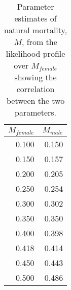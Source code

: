 \begin{table}[H]

\caption{\label{tab:profile-M}Parameter estimates of natural mortality, $M$, from the likelihood profile over $M_{female}$ showing the correlation between the two parameters.}
\centering
\begin{tabular}[t]{rr}
\toprule
$M_{female}$ & $M_{male}$\\
\midrule
0.100 & 0.150\\
0.150 & 0.157\\
0.200 & 0.205\\
0.250 & 0.254\\
0.300 & 0.302\\
0.350 & 0.350\\
0.400 & 0.398\\
0.418 & 0.414\\
0.450 & 0.443\\
0.500 & 0.486\\
\bottomrule
\end{tabular}
\end{table}
